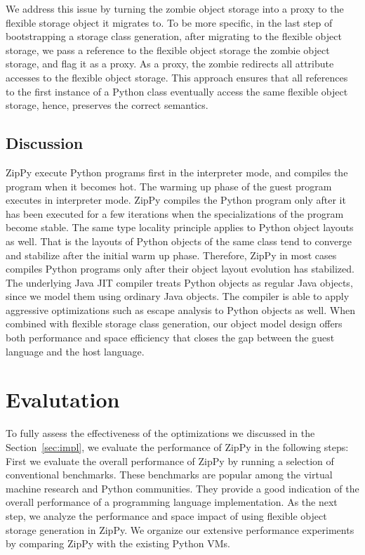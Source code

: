 We address this issue by turning the zombie object storage into a proxy to the flexible storage object it migrates to.
To be more specific, in the last step of bootstrapping a storage class generation, after migrating to the flexible object storage, we pass a reference to the flexible object storage the zombie object storage, and flag it as a proxy.
As a proxy, the zombie redirects all attribute accesses to the flexible object storage.
This approach ensures that all references to the first instance of a Python class eventually access the same flexible object storage, hence, preserves the correct semantics.

\subsection{Discussion}

ZipPy execute Python programs first in the interpreter mode, and compiles the program when it becomes hot.
The warming up phase of the guest program executes in interpreter mode.
ZipPy compiles the Python program only after it has been executed for a few iterations when the specializations of the program become stable.
The same type locality principle applies to Python object layouts as well.
That is the layouts of Python objects of the same class tend to converge and stabilize after the initial warm up phase.
Therefore, ZipPy in most cases compiles Python programs only after their object layout evolution has stabilized.
The underlying Java JIT compiler treats Python objects as regular Java objects, since we model them using ordinary Java objects.
The compiler is able to apply aggressive optimizations such as escape analysis to Python objects as well.
When combined with flexible storage class generation, our object model design offers both performance and space efficiency that closes the gap between the guest language and the host language.

\section{Evalutation}
\label{sec:eval}

To fully assess the effectiveness of the optimizations we discussed in the Section~\ref{sec:impl}, we evaluate the performance of ZipPy in the following steps:
First we evaluate the overall performance of ZipPy by running a selection of conventional benchmarks.
These benchmarks are popular among the virtual machine research and Python communities.
They provide a good indication of the overall performance of a programming language implementation.
As the next step, we analyze the performance and space impact of using flexible object storage generation in ZipPy.
We organize our extensive performance experiments by comparing ZipPy with the existing Python VMs.

